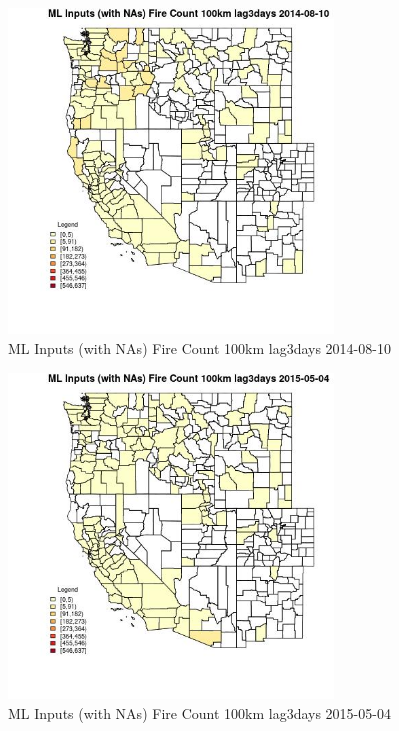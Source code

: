 \begin{figure} 
\centering  
\includegraphics[width=0.77\textwidth]{Code_Outputs/Report_ML_input_PM25_Step4_part_e_de_duplicated_aves_compiled_2019-05-18wNAs_CountyFire_Count_100km_lag3daysMean2014-08-10.jpg} 
\caption{\label{fig:Report_ML_input_PM25_Step4_part_e_de_duplicated_aves_compiled_2019-05-18wNAsCountyFire_Count_100km_lag3daysMean2014-08-10}ML Inputs (with NAs) Fire Count 100km lag3days 2014-08-10} 
\end{figure} 
 

\begin{figure} 
\centering  
\includegraphics[width=0.77\textwidth]{Code_Outputs/Report_ML_input_PM25_Step4_part_e_de_duplicated_aves_compiled_2019-05-18wNAs_CountyFire_Count_100km_lag3daysMean2015-05-04.jpg} 
\caption{\label{fig:Report_ML_input_PM25_Step4_part_e_de_duplicated_aves_compiled_2019-05-18wNAsCountyFire_Count_100km_lag3daysMean2015-05-04}ML Inputs (with NAs) Fire Count 100km lag3days 2015-05-04} 
\end{figure} 
 

